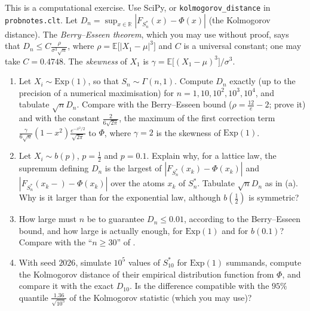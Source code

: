 \begin{exercise}\label{ex:ct-kolmogorov}
\medium This is a computational exercise. Use SciPy, or \texttt{kolmogorov\_distance} in
\texttt{probnotes.clt}. Let $D_n=\sup_{x\in\mathbb R}|F_{S_n^*}(x)-\Phi(x)|$ (the Kolmogorov
distance). The \emph{Berry--Esseen theorem}, which you may use without proof, says that
$D_n\le C\frac{\rho}{\sigma^3\sqrt n}$, where $\rho=\mathbb E\big[|X_1-\mu|^3\big]$ and $C$ is a
universal constant; one may take $C=0.4748$. The \emph{skewness} of $X_1$ is
$\gamma=\mathbb E\big[(X_1-\mu)^3\big]/\sigma^3$.
\begin{enumerate}[label=(\alph*)]
  \item Let $X_i\sim\mathrm{Exp}(1)$, so that $S_n\sim\Gamma(n,1)$. Compute $D_n$ exactly (up to
    the precision of a numerical maximisation) for $n=1,10,10^2,10^3,10^4$, and tabulate
    $\sqrt nD_n$. Compare with the Berry--Esseen bound ($\rho=\frac{12}e-2$; prove it) and with
    the constant $\frac{2}{6\sqrt{2\pi}}$, the maximum of the first correction term
    $\frac{\gamma}{6\sqrt n}(1-x^2)\frac{e^{-x^2/2}}{\sqrt{2\pi}}$ to $\Phi$, where $\gamma=2$ is the
    skewness of $\mathrm{Exp}(1)$.
  \item Let $X_i\sim b(p)$, $p=\frac12$ and $p=0.1$. Explain why, for a lattice law, the supremum
    defining $D_n$ is the largest of $|F_{S_n^*}(x_k)-\Phi(x_k)|$ and
    $|F_{S_n^*}(x_k-)-\Phi(x_k)|$ over the atoms $x_k$ of $S_n^*$. Tabulate $\sqrt nD_n$ as in (a).
    Why is it larger than for the exponential law, although $b(\frac12)$ is symmetric?
  \item How large must $n$ be to guarantee $D_n\le0.01$, according to the Berry--Esseen bound, and
    how large is actually enough, for $\mathrm{Exp}(1)$ and for $b(0.1)$? Compare with the ``$n\ge30$''
    of .
  \item With seed $2026$, simulate $10^5$ values of $S_{10}^*$ for $\mathrm{Exp}(1)$ summands,
    compute the Kolmogorov distance of their empirical distribution function from $\Phi$, and
    compare it with the exact $D_{10}$. Is the difference compatible with the $95\%$ quantile
    $\frac{1.36}{\sqrt{10^5}}$ of the Kolmogorov statistic (which you may use)?
\end{enumerate}
\end{exercise}


